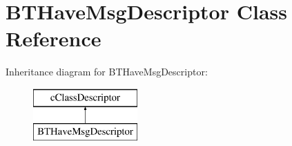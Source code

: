 \hypertarget{classBTHaveMsgDescriptor}{}\section{B\+T\+Have\+Msg\+Descriptor Class Reference}
\label{classBTHaveMsgDescriptor}
Inheritance diagram for B\+T\+Have\+Msg\+Descriptor\+:\begin{figure}[H]
\begin{center}
\leavevmode
\includegraphics[height=2.000000cm]{classBTHaveMsgDescriptor}
\end{center}
\end{figure}
